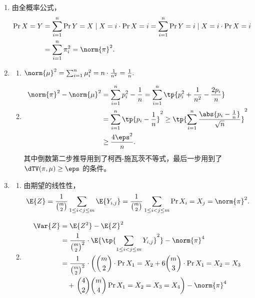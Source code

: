 \begin{solution}
    \begin{enumerate}
        \item 由全概率公式，
        \begin{align*}
            \Pr{X=Y} &= \sum_{i=1}^n \Pr{Y=X\mid X=i}\cdot \Pr{X=i} = \sum_{i=1}^n \Pr{Y=i\mid X=i}\cdot \Pr{X=i} \\
            &= \sum_{i=1}^n \pi_i^2 = \norm{\pi}^2.
        \end{align*}
        \item \begin{enumerate}
            \item $\norm{\mu}^2 = \sum_{i=1}^n \mu_i^2 = n\cdot \frac{1}{n^2} = \frac{1}{n}.$
            \item 
            \begin{align*}
            \norm{\pi}^2 - \norm{\mu}^2 &= \sum_{i=1}^n p_i^2 - \frac{1}{n} = \sum_{i=1}^n \tp{p_i^2 + \frac{1}{n^2} - \frac{2p_i}{n}} \\
            &= \sum_{i=1}^n \tp{p_i-\frac{1}{n}}^2 \geq \tp{\sum_{i=1}^n {\frac{\abs{p_i-\frac{1}{n}}}{\sqrt{n}}}}^2\\
            &\geq \frac{4\eps^2}{n}.
            \end{align*}
            其中倒数第二步推导用到了柯西-施瓦茨不等式，最后一步用到了 $\dTV(\pi,\mu) \geq \eps$ 的条件。
        \end{enumerate} 
        \item \begin{enumerate}
            \item 由期望的线性性，
            \begin{align*}
                \E{Z} = \frac{1}{\binom{m}{2}}\sum_{1\leq i<j \leq m} \E{Y_{i,j}} = \frac{1}{\binom{m}{2}}\sum_{1\leq i<j \leq m} \Pr{X_i=X_j} = \norm{\pi}^2.
            \end{align*}
            \item \begin{align*}
                \Var{Z} &= \E{Z^2} - \E{Z}^2\\
                &= \frac{1}{\binom{m}{2}^2}\cdot \E{\tp{\sum_{1\leq i<j\leq m} Y_{i,j}}^2 }- \norm{\pi}^4\\
                &= \frac{1}{\binom{m}{2}^2}\cdot \left(\binom{m}{2}\cdot \Pr{X_1=X_2} + 6\binom{m}{3}\cdot \Pr{X_1=X_2=X_3}  \right.\\
                &\quad +\left.\binom{4}{2}\binom{m}{4} \Pr{X_1=X_2=X_3=X_4}\right) - \norm{\pi}^4 \\

\end{align*}
\end{enumerate}
\end{enumerate}
\end{solution}
